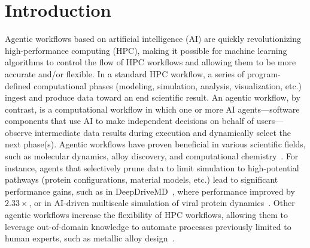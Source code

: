 \section{Introduction}

Agentic workflows based on artificial intelligence (AI) are quickly
revolutionizing high-performance computing (HPC), making it possible for
machine learning algorithms to control the flow of HPC workflows and allowing
them to be more accurate and/or flexible. In a standard HPC workflow, a series
of program-defined computational phases (modeling, simulation, analysis,
visualization, etc.) ingest and produce data toward an end scientific result.
An agentic workflow, by contrast, is a computational workflow in which one or
more AI agents---software components that use AI to make independent decisions
on behalf of users---observe intermediate data results during execution and
dynamically select the next phase(s). Agentic workflows have proven beneficial
in various scientific fields, such as molecular dynamics, alloy discovery, and
computational chemistry~\cite{ai_hpc_survey}. For instance, agents that selectively prune data to
limit simulation to high-potential pathways (protein configurations, material
models, etc.) lead to significant performance gains, such as in
DeepDriveMD~\cite{deepdrivemd_og,parslfest_ddmd_pres}, where performance
improved by $2.33\times$, or in AI-driven multiscale simulation of viral
protein dynamics~\cite{amaro_covid_data}. Other agentic workflows increase
the flexibility of HPC workflows, allowing them to leverage out-of-domain
knowledge to automate processes previously limited to human experts, such as
metallic alloy design~\cite{atomagents}.

